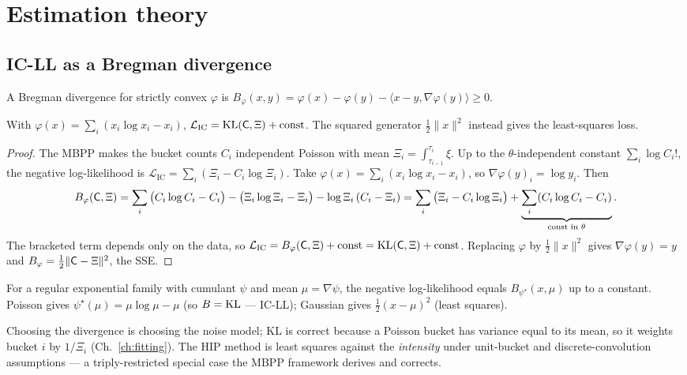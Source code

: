 \chapter{Estimation theory}
\label{app:estimation}

\section{IC-LL as a Bregman divergence}

A Bregman divergence for strictly convex $\varphi$ is
$B_\varphi(x,y)=\varphi(x)-\varphi(y)-\langle x-y,\nabla\varphi(y)\rangle\ge0$.

\begin{proposition}
With $\varphi(x)=\sum_i(x_i\log x_i-x_i)$, $\mathcal L_{\mathrm{IC}}=\operatorname{KL}(\mathsf{C},\Xi)+\text{const}$.
The squared generator $\tfrac12\|x\|^2$ instead gives the least-squares loss.
\end{proposition}
\begin{proof}
The MBPP makes the bucket counts $C_i$ independent Poisson with mean
$\Xi_i=\int_{\tau_{i-1}}^{\tau_i}\xi$. Up to the $\theta$-independent constant
$\sum_i\log C_i!$, the negative log-likelihood is
$\mathcal L_{\mathrm{IC}}=\sum_i(\Xi_i-C_i\log\Xi_i)$. Take $\varphi(x)=\sum_i(x_i\log x_i-x_i)$,
so $\nabla\varphi(y)_i=\log y_i$. Then
\[
B_\varphi(\mathsf{C},\Xi)=\sum_i\big(C_i\log C_i-C_i\big)-\big(\Xi_i\log\Xi_i-\Xi_i\big)-\log\Xi_i\,(C_i-\Xi_i)
=\sum_i\big(\Xi_i-C_i\log\Xi_i\big)+\underbrace{\sum_i(C_i\log C_i-C_i)}_{\text{const in }\theta}.
\]
The bracketed term depends only on the data, so
$\mathcal L_{\mathrm{IC}}=B_\varphi(\mathsf{C},\Xi)+\text{const}=\operatorname{KL}(\mathsf{C},\Xi)+\text{const}$.
Replacing $\varphi$ by $\tfrac12\|x\|^2$ gives $\nabla\varphi(y)=y$ and
$B_\varphi=\tfrac12\|\mathsf{C}-\Xi\|^2$, the SSE.
\end{proof}

\begin{theorem}
For a regular exponential family with cumulant $\psi$ and mean $\mu=\nabla\psi$, the
negative log-likelihood equals $B_{\psi^\star}(x,\mu)$ up to a constant. Poisson
gives $\psi^\star(\mu)=\mu\log\mu-\mu$ (so $B=\operatorname{KL}$ --- IC-LL); Gaussian gives
$\tfrac12(x-\mu)^2$ (least squares).
\end{theorem}
Choosing the divergence is choosing the noise model; KL is correct because a
Poisson bucket has variance equal to its mean, so it weights bucket $i$ by
$1/\Xi_i$ (Ch.~\ref{ch:fitting}). The HIP method is least squares against the
\emph{intensity} under unit-bucket and discrete-convolution assumptions --- a
triply-restricted special case the MBPP framework derives and corrects.

